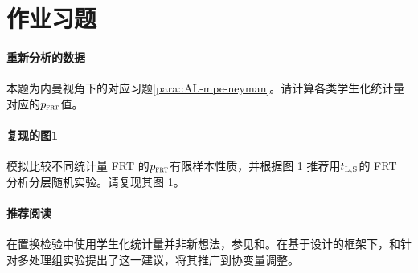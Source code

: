  \section{作业习题}


\paragraph{重新分析\citet{angrist2009effects}的数据}\label{para::AL-mpe-fisher}

本题为内曼视角下的对应习题\ref{para::AL-mpe-neyman}。请计算各类学生化统计量对应的$p_{\textsc{frt}}$值。 


\paragraph{复现\citet{zhao2020caFRT}的图1}\label{para::zhaoding-xfrt}

\citet{zhao2020caFRT}模拟比较不同统计量 FRT 的$p_{\textsc{frt}}$有限样本性质，并根据图 1 推荐用$t_\textsc{L,S} $的 FRT 分析分层随机实验。请复现其图 1。 


\paragraph{推荐阅读}

在置换检验中使用学生化统计量并非新想法，参见\citet{Janssen97}和\citet{Romano13}。在基于设计的框架下，\citet{ding2017randomization}和\citet{wu2018randomization}针对多处理组实验提出了这一建议，\citet{zhao2020caFRT}将其推广到协变量调整。  

